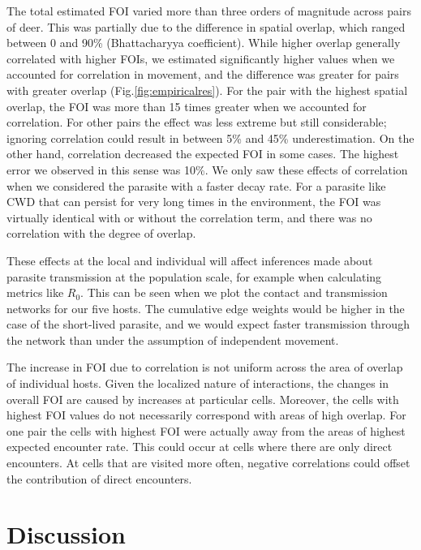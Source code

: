 \documentclass[letterpaper]{article}
\begin{document}
The total estimated FOI varied more than three orders of magnitude across pairs of deer. This was partially due to the difference in spatial overlap, which ranged between 0 and 90\% (Bhattacharyya coefficient). While higher overlap generally correlated with higher FOIs, we estimated significantly higher values when we accounted for correlation in movement, and the difference was greater for pairs with greater overlap (Fig.\ref{fig:empiricalres}). For the pair with the highest spatial overlap, the FOI was more than 15 times greater when we accounted for correlation. For other pairs the effect was less extreme but still considerable; ignoring correlation could result in between 5\% and 45\% underestimation. On the other hand, correlation decreased the expected FOI in some cases. The highest error we observed in this sense was 10\%. 
We only saw these effects of correlation when we considered the parasite with a faster decay rate. For a parasite like CWD that can persist for very long times in the environment, the FOI was virtually identical with or without the correlation term, and there was no correlation with the degree of overlap.

These effects at the local and individual will affect inferences made about parasite transmission at the population scale, for example when calculating metrics like $R_0$. This can be seen when we plot the contact and transmission networks for our five hosts. The cumulative edge weights would be higher in the case of the short-lived parasite, and we would expect faster transmission through the network than under the assumption of independent movement. 

The increase in FOI due to correlation is not uniform across the area of overlap of individual hosts. Given the localized nature of interactions, the changes in overall FOI are caused by increases at particular cells. Moreover, the cells with highest FOI values do not necessarily correspond with areas of high overlap. For one pair the cells with highest FOI were actually away from the areas of highest expected encounter rate. This could occur at cells where there are only direct encounters. At cells that are visited more often, negative correlations could offset the contribution of direct encounters. 

\section*{Discussion}
\end{document}
